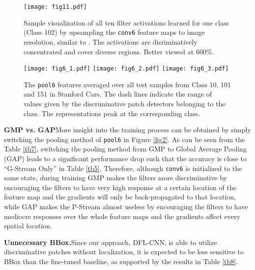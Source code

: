\documentclass[10pt,twocolumn,letterpaper]{article}
\begin{document}
\begin{figure*}
\begin{minipage}{\textwidth}
\texttt{[image: fig11.pdf]}
\caption{\label{fig11} Sample visualization of all ten filter activations learned for one class (Class
102) by upsampling the \texttt{conv6} feature maps to image resolution, similar to \cite{bolei}. The activations are 
disriminatively concentrated and cover diverse regions. Better viewed at 600\%.}
\end{minipage}
\begin{minipage}{\textwidth}
\texttt{[image: fig6\_1.pdf]}
\texttt{[image: fig6\_2.pdf]}
\texttt{[image: fig6\_3.pdf]}
   \vspace{-10pt}
\caption{\label{fig6} The \texttt{pool6} features averaged over all test samples from Class 10,
101 and 151 in Stanford Cars. The dash lines indicate the range of values given by the discriminative patch detectors belonging to the
class. The representations peak at the corresponding class.}
   \vspace{-10pt}
\end{minipage}
\end{figure*}
\noindent\textbf{GMP vs. GAP}\quad More insight into the training process can be obtained by simply switching the pooling method
of \texttt{pool6} in Figure \ref{fig2}. As can be seen from the Table \ref{tb7}, switching the pooling method from
GMP to Global Average Pooling (GAP) leads to a significant performance drop such that the accuracy is
close to ``G-Stream Only'' in Table \ref{tb5}. Therefore, although
\texttt{conv6} is initialized to the same state, during training GMP makes the filters more discriminative by
encouraging the  filters to have very high response at a certain location of the feature map and the gradients
will only be back-propagated to that location, while GAP makes the P-Stream almost useless by encouraging the filters
to have mediocre responses over the whole feature maps and the gradients affect every spatial location.

\noindent\textbf{Unnecessary BBox.}\quad Since our approach, DFL-CNN, is able to utilize discriminative patches without
localization, it is expected to be less sensitive to BBox than the fine-tuned baseline, as supported by the
results in Table \ref{tb8}.
\end{document}
